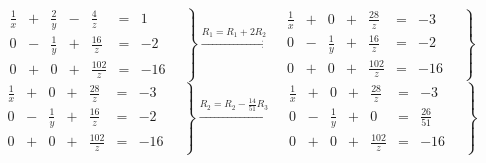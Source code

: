 \documentclass[11pt]{article}
\begin{document}
\begin{equation*}
  \left.
    \begin{alignedat}{5}
      &  \frac{1}{x} & {}+{} & \frac{2}{y} & {}-{} & \frac{4}{z}   & {}={} & 1 \\
      &  0           & {}-{} & \frac{1}{y} & {}+{} & \frac{16}{z}  & {}={} & -2 \\
      &  0           & {}+{} & 0           & {}+{} & \frac{102}{z} & {}={} & -16
    \end{alignedat}
    \quad \right\}
  \xrightarrow{R_1 = R_1 + 2R_2}
  \left.
    \begin{alignedat}{5}
      &  \frac{1}{x} & {}+{} & 0           & {}+{} & \frac{28}{z}  & {}={} & -3 \\
      &  0           & {}-{} & \frac{1}{y} & {}+{} & \frac{16}{z}  & {}={} & -2 \\
      &  0           & {}+{} & 0           & {}+{} & \frac{102}{z} & {}={} & -16
    \end{alignedat}
    \quad \right\}
\end{equation*}
\begin{equation*}
  \left.
    \begin{alignedat}{5}
      &  \frac{1}{x} & {}+{} & 0           & {}+{} & \frac{28}{z}  & {}={} & -3 \\
      &  0           & {}-{} & \frac{1}{y} & {}+{} & \frac{16}{z}  & {}={} & -2 \\
      &  0           & {}+{} & 0           & {}+{} & \frac{102}{z} & {}={} & -16
    \end{alignedat}
    \quad \right\}
  \xrightarrow{R_2 = R_2 - \frac{14}{51}R_3}
  \left.
    \begin{alignedat}{5}
      &  \frac{1}{x} & {}+{} & 0           & {}+{} & \frac{28}{z}  & {}={} & -3 \\
      &  0           & {}-{} & \frac{1}{y} & {}+{} & 0  & {}={}    & \frac{26}{51} \\
      &  0           & {}+{} & 0           & {}+{} & \frac{102}{z} & {}={} & -16
    \end{alignedat}
    \quad \right\}
\end{equation*}
\end{document}
